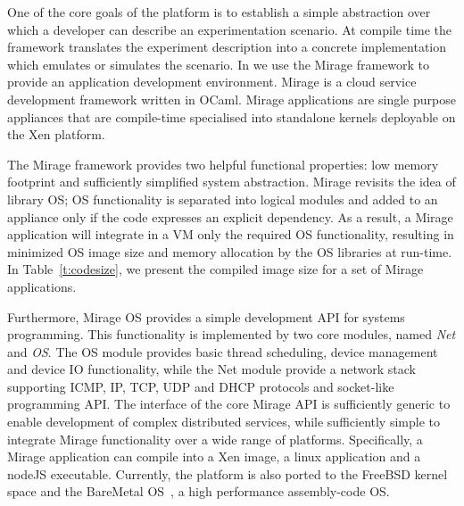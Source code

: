One of the core goals of the \sdnsim platform is to establish a simple
abstraction over which a developer can describe an experimentation scenario.  At
compile time the framework translates the experiment description into a concrete
implementation which emulates or simulates the scenario.  In \sdnsim we use the
Mirage framework to provide an application development environment. Mirage is a
cloud service development framework written in OCaml.  Mirage applications are
single purpose appliances that are compile-time specialised into standalone
kernels deployable on the Xen platform.  

The Mirage framework provides two helpful functional properties: low memory
footprint and sufficiently simplified system abstraction.  Mirage revisits the idea of
library OS; OS functionality is separated into logical modules and added to an
appliance only if the code expresses an explicit dependency.  As a result, a
Mirage application will integrate in a VM only the required OS functionality, 
resulting in minimized OS image size and memory allocation by the OS libraries 
at run-time. In Table~\ref{t:codesize}, we present the compiled image size for a
set of Mirage applications.

Furthermore, Mirage OS provides a simple development API for systems
programming. This functionality is implemented by two core modules, named
\textit{Net} and \textit{OS}.  The OS module provides basic thread scheduling,
device management and device IO functionality, while the Net module provide a
network stack supporting ICMP, IP, TCP, UDP and DHCP protocols and socket-like
programming API. The interface of the core Mirage API is sufficiently generic to
enable development of complex distributed services, while sufficiently simple to
integrate Mirage functionality over a wide range of platforms. Specifically, a
Mirage application can compile into a Xen image, a linux application and a
nodeJS executable. Currently, the platform is also ported to the FreeBSD kernel
space and the BareMetal OS~\cite{baremetalOS}, a high performance
assembly-code OS.

